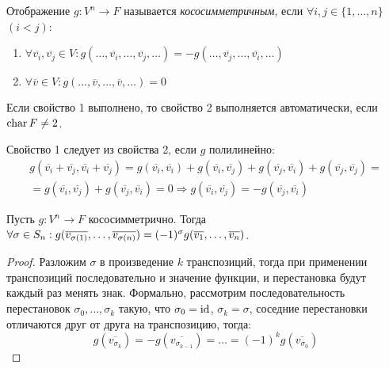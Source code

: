 \begin{definition}
	Отображение $g: V^n \rightarrow F$ называется \textit{кососимметричным}, если $\forall i, j \in \{1, \dots, n\}$ $(i < j)$:
	\begin{enumerate}
		\item $\forall \overline{v_i}, \overline{v_j} \in V: g(\dots, \overline{v_i}, \dots, \overline{v_j}, \dots) = -g(\dots, \overline{v_j}, \dots, \overline{v_i}, \dots)$
		\item $\forall \overline{v} \in V: g(\dots, \overline{v}, \dots, \overline{v}, \dots) = 0$
	\end{enumerate}
\end{definition}

\begin{note}
	Если свойство 1 выполнено, то свойство 2 выполняется автоматически, если $\operatorname{char}{F} \ne 2$.
\end{note}

\begin{note}
	Свойство 1 следует из свойства 2, если $g$ полилинейно:
	\begin{multline*}
		g(\overline{v_i} + \overline{v_j}, \overline{v_i} + \overline{v_j}) = g(\overline{v_i}, \overline{v_i}) + g(\overline{v_i}, \overline{v_j}) + g(\overline{v_j}, \overline{v_i}) + g(\overline{v_j}, \overline{v_j}) =\\
		= g(\overline{v_i}, \overline{v_j}) + g(\overline{v_j}, \overline{v_i}) = 0 \Rightarrow g(\overline{v_i}, \overline{v_j}) = -g(\overline{v_j}, \overline{v_i})
	\end{multline*}
\end{note}

\begin{proposition}
	Пусть $g : V^n \rightarrow F$ кососимметрично. Тогда $\forall \sigma \hm{\in} S_n: g(\overline{v_{\sigma(1)}}, \dots, \overline{v_{\sigma(n)}}) = (-1)^\sigma g(\overline{v_1}, \dots, \overline{v_n})$.
\end{proposition}

\begin{proof}
	Разложим $\sigma$ в произведение $k$ транспозиций, тогда при применении транспозиций последовательно и значение функции, и перестановка будут каждый раз менять знак. Формально, рассмотрим последовательность перестановок $\sigma_0, \dots, \sigma_k$ такую, что $\sigma_0 = \mathrm{id}$, $\sigma_k = \sigma$, соседние перестановки отличаются друг от друга на транспозицию, тогда:
	\[g(\overline{v_{\sigma_k}}) = -g(\overline{v_{\sigma_{k - 1}}}) = \dots = (-1)^kg(\overline{v_{\sigma_{0}}})\]
\end{proof}

